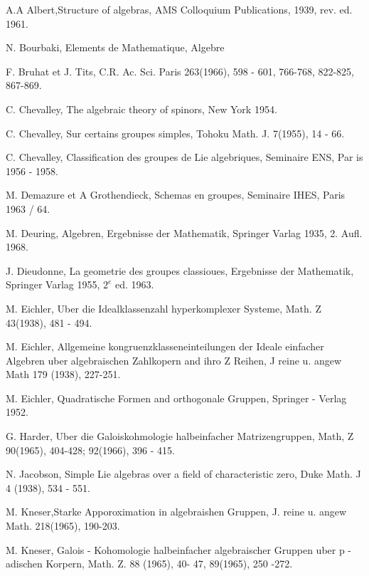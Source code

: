 \begin{thebibliography}{99}
 {A.A Albert},\pageoriginale  Structure of algebras, AMS
  Colloquium Publications, 1939, rev. ed. 1961. 

 {N. Bourbaki}, Elements de Mathematique, Algebre 

 {F. Bruhat et J}. Tits, C.R. Ac. Sci. Paris
  263(1966), 598 - 601, 766-768, 822-825, 867-869. 

 {C. Chevalley}, The algebraic theory of spinors, New
  York 1954. 

 {C. Chevalley}, Sur certains groupes simples, Tohoku
  Math. J. 7(1955), 14 - 66. 

 {C. Chevalley}, Classification des groupes de Lie
  algebriques, Seminaire ENS, Par is 1956 - 1958.

 {M. Demazure et} A Grothendieck, Schemas en groupes,
  Seminaire IHES, Paris 1963 / 64. 

 { M. Deuring}, Algebren, Ergebnisse der Mathematik,
  Springer Varlag 1935, 2. Aufl. 1968. 

 {J. Dieudonne}, La geometrie des groupes classioues,
  Ergebnisse der Mathematik, Springer Varlag 1955, $2^e$ ed. 1963.    

 {M. Eichler}, Uber die Idealklassenzahl hyperkomplexer
  Systeme, Math. Z 43(1938), 481 - 494. 

 {M. Eichler}, Allgemeine kongruenzklasseneinteilungen
  der Ideale einfacher Algebren uber algebraischen Zahlkopern and ihro
  Z Reihen, J reine u. angew Math 179 (1938), 227-251. 

 {M. Eichler}, Quadratische Formen and orthogonale
  Gruppen, Springer - Verlag 1952. 

 {G. Harder}, Uber die Galoiskohmologie halbeinfacher
  Matrizengruppen, Math, Z 90(1965), 404-428; 92(1966), 396 - 415. 

 {N. Jacobson}, Simple Lie algebras over a field of
  characteristic zero, Duke Math. J 4 (1938), 534 - 551. 

 {M. Kneser},\pageoriginale Starke Apporoximation in algebraishen
  Gruppen, J. reine u. angew Math. 218(1965), 190-203. 

 {M. Kneser}, Galois - Kohomologie halbeinfacher
  algebraischer Gruppen uber p - adischen Korpern, Math. Z. 88
  (1965), 40- 47, 89(1965), 250 -272. 


\end{thebibliography}
